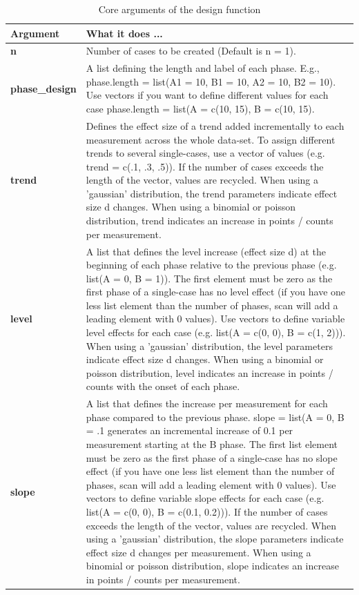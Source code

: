 \documentclass[
]{book}
\begin{document}
\begin{table}

\caption{\label{tab:design-arguments}Core arguments of the design function}
\begin{tabular}[t]{>{\raggedright\arraybackslash}p{15em}>{\raggedright\arraybackslash}p{30em}}
\toprule
Argument & What it does ...\\
\midrule
\textbf{n} & Number of cases to be created (Default is n = 1).\\
\textbf{phase\_design} & A list defining the length and label of each phase. E.g., phase.length = list(A1 = 10, B1 = 10, A2 = 10, B2 = 10). Use vectors if you want to define different values for each case phase.length = list(A = c(10, 15), B = c(10, 15).\\
\textbf{trend} & Defines the effect size of a trend added incrementally to each measurement across the whole data-set. To assign different trends to several single-cases, use a vector of values (e.g. trend = c(.1, .3, .5)). If the number of cases exceeds the length of the vector, values are recycled. When using a 'gaussian' distribution, the trend parameters indicate effect size d changes. When using a binomial or poisson distribution, trend indicates an increase in points / counts per measurement.\\
\textbf{level} & A list that defines the level increase (effect size d) at the beginning of each phase relative to the previous phase (e.g. list(A = 0, B = 1)). The first element must be zero as the first phase of a single-case has no level effect (if you have one less list element than the number of phases, scan will add a leading element with 0 values). Use vectors to define variable level effects for each case (e.g. list(A = c(0, 0), B = c(1, 2))). When using a 'gaussian' distribution, the level parameters indicate effect size d changes. When using a binomial or poisson distribution, level indicates an increase in points / counts with the onset of each phase.\\
\textbf{slope} & A list that defines the increase per measurement for each phase compared to the previous phase. slope = list(A = 0, B = .1 generates an incremental increase of 0.1 per measurement starting at the B phase. The first list element must be zero as the first phase of a single-case has no slope effect (if you have one less list element than the number of phases, scan will add a leading element with 0 values). Use vectors to define variable slope effects for each case (e.g. list(A = c(0, 0), B = c(0.1, 0.2))). If the number of cases exceeds the length of the vector, values are recycled. When using a 'gaussian' distribution, the slope parameters indicate effect size d changes per measurement. When using a binomial or poisson distribution, slope indicates an increase in points / counts per measurement.\\

\end{tabular}
\end{table}
\end{document}
